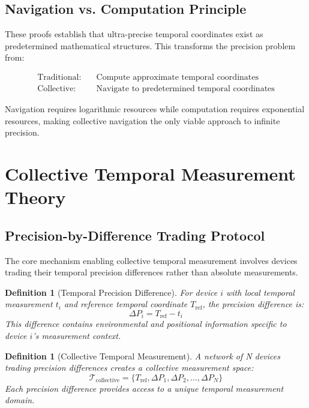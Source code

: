 \documentclass[12pt,a4paper]{article}
\newtheorem{definition}[theorem]{Definition}
\begin{document}
\subsection{Navigation vs. Computation Principle}

These proofs establish that ultra-precise temporal coordinates exist as predetermined mathematical structures. This transforms the precision problem from:

\begin{align}
\text{Traditional}: &\quad \text{Compute approximate temporal coordinates} \\
\text{Collective}: &\quad \text{Navigate to predetermined temporal coordinates}
\end{align}

Navigation requires logarithmic resources while computation requires exponential resources, making collective navigation the only viable approach to infinite precision.

\section{Collective Temporal Measurement Theory}

\subsection{Precision-by-Difference Trading Protocol}

The core mechanism enabling collective temporal measurement involves devices trading their temporal precision differences rather than absolute measurements.

\begin{definition}[Temporal Precision Difference]
For device $i$ with local temporal measurement $t_i$ and reference temporal coordinate $T_{\text{ref}}$, the precision difference is:
$$\Delta P_i = T_{\text{ref}} - t_i$$
This difference contains environmental and positional information specific to device $i$'s measurement context.
\end{definition}

\begin{definition}[Collective Temporal Measurement]
A network of N devices trading precision differences creates a collective measurement space:
$$\mathcal{T}_{\text{collective}} = \{T_{\text{ref}}, \Delta P_1, \Delta P_2, \ldots, \Delta P_N\}$$
Each precision difference provides access to a unique temporal measurement domain.
\end{definition}
\end{document}
